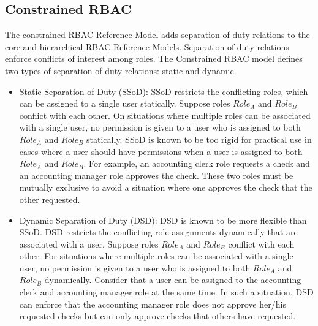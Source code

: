 \subsection{Constrained RBAC}

The constrained RBAC Reference Model adds separation of duty relations to the core and hierarchical RBAC Reference Models. 
Separation of duty relations enforce conflicts of interest among roles. 
The Constrained RBAC model defines two types of separation of duty relations: static and dynamic.

\begin{itemize}
\item Static Separation of Duty (SSoD): SSoD restricts the conflicting-roles, which can be assigned to a single user statically. 
Suppose roles $Role_A$ and $Role_B$ conflict with each other. On situations where multiple roles can be associated with a single user, no permission is given to a user who is assigned to both $Role_A$ and $Role_B$ statically. 
SSoD is known to be too rigid for practical use in cases where a user should have permissions when a user is assigned to both $Role_A$ and $Role_B$. 
For example, an accounting clerk role requests a check and an accounting manager role approves the check. 
These two roles must be mutually exclusive to avoid a situation where one approves the check that the other requested.
	
\item Dynamic Separation of Duty (DSD): DSD is known to be more flexible than SSoD. 
DSD restricts the conflicting-role assignments dynamically that are associated with a user. 
Suppose roles $Role_A$ and $Role_B$ conflict with each other. 
For situations where multiple roles can be associated with a single user, no permission is given to a user who is assigned to both $Role_A$ and $Role_B$ dynamically.	
Consider that a user can be assigned to the accounting clerk and accounting manager role at the same time.
In such a situation, DSD can enforce that the accounting manager role does not approve her/his requested checks but can only approve checks that others have requested.
\end{itemize}
